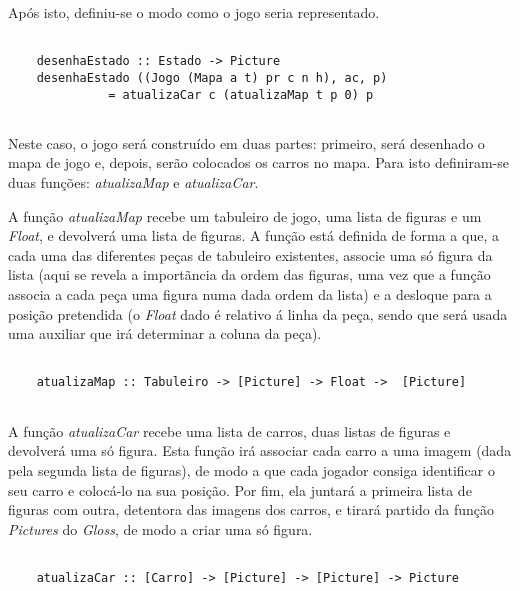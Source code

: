 \documentclass[a4paper]{report} %
\begin{document}
  \par \noindent Após isto, definiu-se o modo como o jogo seria representado.
  
  \begin{verbatim}
      
    desenhaEstado :: Estado -> Picture
    desenhaEstado ((Jogo (Mapa a t) pr c n h), ac, p) 
              = atualizaCar c (atualizaMap t p 0) p
  
  \end{verbatim}
  
  \par \noindent Neste caso, o jogo será construído em duas partes: primeiro, será desenhado o mapa de jogo e, depois, serão colocados os carros no mapa. Para isto definiram-se duas funções: \textit{atualizaMap} e \textit{atualizaCar}.
  
  \hspace{1cm}
  
  \par \noindent A função \textit{atualizaMap} recebe um tabuleiro de jogo, uma lista de figuras e um \textit{Float}, e devolverá uma lista de figuras. A função está definida de forma a que, a cada uma das diferentes peças de tabuleiro existentes, associe uma só figura da lista (aqui se revela a importãncia da ordem das figuras, uma vez que a função associa a cada peça uma figura numa dada ordem da lista) e a desloque para a posição pretendida (o \textit{Float} dado é relativo á linha da peça, sendo que será usada uma auxiliar que irá determinar a coluna da peça).
  
  \begin{verbatim}
      
    atualizaMap :: Tabuleiro -> [Picture] -> Float ->  [Picture]  
      
  \end{verbatim}
  
  \par \noindent A função \textit{atualizaCar} recebe uma lista de carros, duas listas de figuras e devolverá uma só figura. Esta função irá associar cada carro a uma imagem (dada pela segunda lista de figuras), de modo a que cada jogador consiga identificar o seu carro e colocá-lo na sua posição. Por fim, ela juntará a primeira lista de figuras com outra, detentora das imagens dos carros, e tirará partido da função \textit{Pictures} do \textit{Gloss}, de modo a criar uma só figura.
  
  \begin{verbatim}
      
    atualizaCar :: [Carro] -> [Picture] -> [Picture] -> Picture  
      
  \end{verbatim}
  
\end{document}
